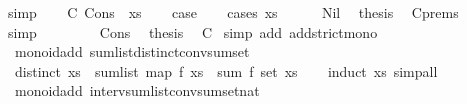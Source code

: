 \begin{isabellebody}
\ simp\isanewline
{}\isamarkupfalse%
\isanewline
\ \ \isamarkupfalse%
\ C{\isacharcolon}{\kern0pt}\ {\isacharparenleft}{\kern0pt}Cons\ {\isacharunderscore}{\kern0pt}\ xs{\isacharparenright}{\kern0pt}\isanewline
\ \ \isamarkupfalse%
\ {\isacharquery}{\kern0pt}case\isanewline
\ \ \isamarkupfalse%
\ {\isacharparenleft}{\kern0pt}cases\ xs{\isacharparenright}{\kern0pt}\isanewline
\ \ \ \ \isamarkupfalse%
\ Nil\ \isamarkupfalse%
\ {\isacharquery}{\kern0pt}thesis\ \isamarkupfalse%
\ C{\isachardot}{\kern0pt}prems\ \isamarkupfalse%
\ simp\isanewline
\ \ \isamarkupfalse%
\isanewline
\ \ \ \ \isamarkupfalse%
\ Cons\ \isamarkupfalse%
\ {\isacharquery}{\kern0pt}thesis\ \isamarkupfalse%
\ C\ \isamarkupfalse%
{\isacharparenleft}{\kern0pt}simp\ add{\isacharcolon}{\kern0pt}\ add{\isacharunderscore}{\kern0pt}strict{\isacharunderscore}{\kern0pt}mono{\isacharparenright}{\kern0pt}\isanewline
\ \ \isamarkupfalse%
\isanewline
{}\isamarkupfalse%
%
\endisatagproof
{\isafoldproof}%
%
\isadelimproof
\isanewline
%
\endisadelimproof
\isanewline
{}\isamarkupfalse%
\ {\isacharparenleft}{\kern0pt}\ monoid{\isacharunderscore}{\kern0pt}add{\isacharparenright}{\kern0pt}\ sum{\isacharunderscore}{\kern0pt}list{\isacharunderscore}{\kern0pt}distinct{\isacharunderscore}{\kern0pt}conv{\isacharunderscore}{\kern0pt}sum{\isacharunderscore}{\kern0pt}set{\isacharcolon}{\kern0pt}\isanewline
\ \ {\isachardoublequoteopen}distinct\ xs\ {\isasymLongrightarrow}\ sum{\isacharunderscore}{\kern0pt}list\ {\isacharparenleft}{\kern0pt}map\ f\ xs{\isacharparenright}{\kern0pt}\ {\isacharequal}{\kern0pt}\ sum\ f\ {\isacharparenleft}{\kern0pt}set\ xs{\isacharparenright}{\kern0pt}{\isachardoublequoteclose}\isanewline
%
\isadelimproof
\ \ %
\endisadelimproof
%
\isatagproof
{}\isamarkupfalse%
\ {\isacharparenleft}{\kern0pt}induct\ xs{\isacharparenright}{\kern0pt}\ simp{\isacharunderscore}{\kern0pt}all%
\endisatagproof
{\isafoldproof}%
%
\isadelimproof
\isanewline
%
\endisadelimproof
\isanewline
{}\isamarkupfalse%
\ {\isacharparenleft}{\kern0pt}\ monoid{\isacharunderscore}{\kern0pt}add{\isacharparenright}{\kern0pt}\ interv{\isacharunderscore}{\kern0pt}sum{\isacharunderscore}{\kern0pt}list{\isacharunderscore}{\kern0pt}conv{\isacharunderscore}{\kern0pt}sum{\isacharunderscore}{\kern0pt}set{\isacharunderscore}{\kern0pt}nat{\isacharcolon}{\kern0pt}\isanewline

\end{isabellebody}

